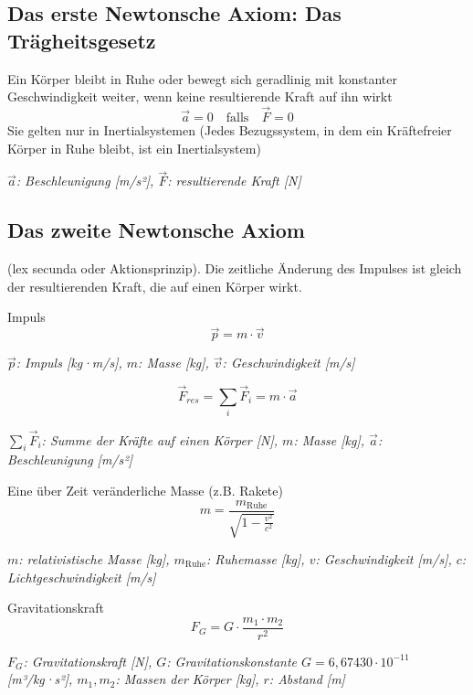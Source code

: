 \documentclass[a4paper,10pt]{article}
\newenvironment{displayformula}
{
	\begin{framed}
		\color{formulaColor}
	}
	{\end{framed}}
\newcommand{\formulalegend}[1]{%
	\par\vspace{0.5ex}%
	{{\color{legendColor}\RaggedRight\small\textit{#1}}}%
	\par\vspace{1.5ex}%
}
\begin{document}
\subsection{Das erste Newtonsche Axiom: Das Trägheitsgesetz}

\begin{displayformula}
	Ein Körper bleibt in Ruhe oder bewegt sich geradlinig mit konstanter Geschwindigkeit weiter, wenn keine resultierende Kraft auf ihn wirkt
	\[
	\vec{a} = 0 \quad \text{falls} \quad \vec{F} = 0
	\]
	Sie gelten nur in Inertialsystemen (Jedes Bezugssystem, in dem ein Kräftefreier Körper in Ruhe bleibt, ist ein Inertialsystem)
\end{displayformula}
\formulalegend{
	\( \vec{a} \): Beschleunigung [m/s²], \( \vec{F} \): resultierende Kraft [N]
}

\subsection{Das zweite Newtonsche Axiom}

\begin{displayformula}
	(lex secunda oder Aktionsprinzip). Die zeitliche Änderung des Impulses ist gleich der  
	resultierenden Kraft, die auf einen Körper wirkt.
\end{displayformula}

\begin{displayformula}
	Impuls
	\[
	\vec{p} = m \cdot \vec{v}
	\]
\end{displayformula}
\formulalegend{
	\( \vec{p} \): Impuls [kg·m/s], \( m \): Masse [kg], \( \vec{v} \): Geschwindigkeit [m/s]
}

\begin{displayformula}
	\[
	\vec{F}_{res} = \sum_{i} \vec{F}_i = m \cdot \vec{a}
	\]
\end{displayformula}
\formulalegend{
	\( \sum_{i} \vec{F}_i \): Summe der Kräfte auf einen Körper [N], \( m \): Masse [kg], \( \vec{a} \): Beschleunigung [m/s²]
}

\begin{displayformula}
	Eine über Zeit veränderliche Masse (z.B. Rakete)
	\[
	m = \frac{m_{\text{Ruhe}}}{\sqrt{1 - \frac{v^2}{c^2}}}
	\]
\end{displayformula}
\formulalegend{
	\( m \): relativistische Masse [kg], \( m_{\text{Ruhe}} \): Ruhemasse [kg], \( v \): Geschwindigkeit [m/s], \( c \): Lichtgeschwindigkeit [m/s]
}

\begin{displayformula}
	Gravitationskraft
	\[
	F_G = G \cdot \frac{m_1 \cdot m_2}{r^2}
	\]
\end{displayformula}
\formulalegend{
	\( F_G \): Gravitationskraft [N], \( G \): Gravitationskonstante $G = 6,67430 \cdot 10^{-11}$[m³/kg·s²], \( m_1, m_2 \): Massen der Körper [kg], \( r \): Abstand [m]
}
\end{document}
